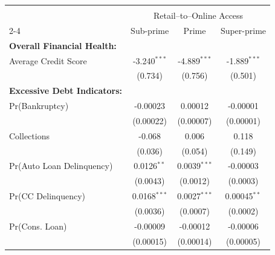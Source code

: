 

\begin{tabular}{@{\extracolsep{5pt}} lccc} 
\\[-1.8ex]\hline 
\hline \\[-1.8ex] 
&  \multicolumn{3}{c}{Retail--to--Online Access}\\
\cmidrule(lr){2-4}
& Sub-prime & Prime & Super-prime \\ 
\midrule
\textbf{Overall Financial Health:}  &   & & \\ 
 Average Credit Score & -3.240$^{***}$ & -4.889$^{***}$ & -1.889$^{***}$ \\ 
 & (0.734) & (0.756) & (0.501) \\ 
 \addlinespace
 \textbf{Excessive Debt Indicators:}  &   & & \\ 
Pr(Bankruptcy) & -0.00023 & 0.00012 & -0.00001 \\ 
 & (0.00022) & (0.00007) & (0.00001) \\ 
  \addlinespace
Collections & -0.068 & 0.006 & 0.118 \\ 
 & (0.036) & (0.054) & (0.149) \\
  \addlinespace
Pr(Auto Loan Delinquency) & 0.0126$^{**}$ & 0.0039$^{***}$ & -0.00003 \\ 
  & (0.0043) & (0.0012) & (0.0003) \\ 
   \addlinespace
 Pr(CC Delinquency) & 0.0168$^{***}$ & 0.0027$^{***}$ & 0.00045$^{**}$ \\ 
  & (0.0036) & (0.0007) & (0.0002) \\ 
   \addlinespace
 Pr(Cons. Loan) & -0.00009 & -0.00012 & -0.00006 \\ 
  & (0.00015) & (0.00014) & (0.00005) \\  
   \bottomrule
\end{tabular}